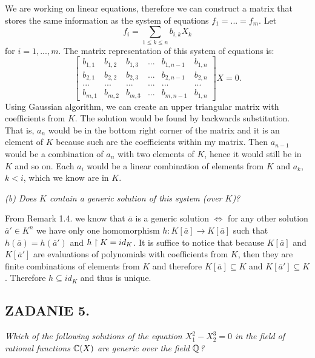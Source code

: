 \documentclass{article}
\begin{document}

We are working on linear equations, therefore we can construct a matrix that stores the same information as the system of equations $f_1=...=f_m$. Let
$$f_i=\sum\limits_{1\leq k\leq n}b_{i, k}X_k$$
for $i=1,...,m$. The matrix representation of this system of equations is:
$$\begin{bmatrix}
    b_{1,1} & b_{1, 2} & b_{1, 3} &... &b_{1, n-1} & b_{1, n}\\
    b_{2,1} & b_{2, 2} & b_{2, 3} &... &b_{2, n-1} & b_{2, n}\\
    ...     &   ...    & ...      &... & ...       & ...\\
    b_{m,1} & b_{m, 2} & b_{m, 3} &... &b_{m, n-1} & b_{1, n}
\end{bmatrix}X=0.$$
Using Gaussian algorithm, we can create an upper triangular matrix with coefficients from $K$. The solution would be found by backwards substitution. That is, $a_n$ would be in the bottom right corner of the matrix and it is an element of $K$ because such are the coefficients within my matrix. Then $a_{n-1}$ would be a combination of $a_n$ with two elements of $K$, hence it would still be in $K$ and so on. Each $a_i$ would be a linear combination of elements from $K$ and $a_k$, $k<i$, which we know are in $K$.

\proofend

\emph{\color{pink}(b) Does $K$ contain a generic solution of this system (over $K$)?}
\smallskip

From Remark 1.4. we know that $\overline{a}$ is a generic solution $\iff$ for any other solution $\overline a'\in K^n$ we have only one homomorphism $h:K[\overline a]\to K[\overline a]$ such that $h(\overline{a})=h(\overline{a}')$ and $h\upharpoonright K=id_K$. It is suffice to notice that because $K[\overline a]$ and $K[\overline a']$ are evaluations of polynomials with coefficients from $K$, then they are finite combinations of elements from $K$ and therefore $K[\overline{a}]\subseteq K$ and $K[\overline a']\subseteq K$. Therefore $h\subseteq id_K$ and thus is unique.

\subsection*{ZADANIE 5.}
\emph{\color{pink}Which of the following solutions of the equation $X_1^2-X_2^3=0$ in the field of rational functions $\mathbb{C}(X)$ are generic over the field $\mathbb{Q}$?}
\end{document}
